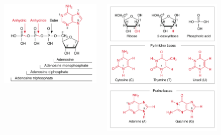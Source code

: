 \documentclass[11pt,ignorenonframetext,aspectratio=169]{beamer}
\begin{document}
\begin{frame}{}
\protect\hypertarget{section-6}{}
\begin{figure}
  \begin{columns}[T,onlytextwidth]

  \begin{center}
  \includegraphics[width=0.96\linewidth]{../images/nucleotide_blocks1.png}
  \end{center}
  
  \begin{center}
  \includegraphics[width=0.95\linewidth]{../images/nucleotide_blocks.png}
  \end{center}
  

\end{columns}
\end{figure}
\end{frame}
\end{document}
